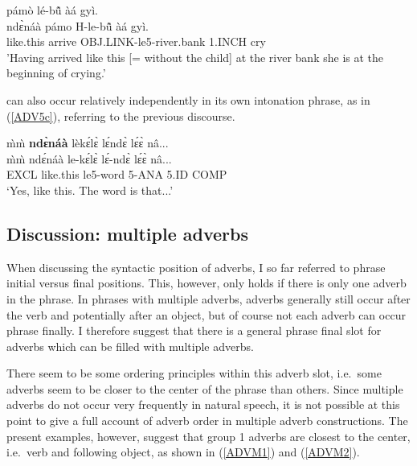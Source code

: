 \begin{exe} 
\ex\label{ADV5b}
   pámò lé-bũ̂ àá gyì. \\
        ndɛ̀náà pámo H-le-bũ̂ àá gyì. \\
        like.this arrive OBJ.LINK-le5-river.bank 1.INCH cry  \\
    \trans 'Having arrived like this [= without the child] at the river bank she is at the beginning of crying.'
\end{exe}

 can also occur relatively independently in its own intonation phrase, as in (\ref{ADV5c}), referring to the previous discourse.

\begin{exe} 
\ex\label{ADV5c}
  \glll   m̀m̀ {\bfseries ndɛ̀náà} lèkɛ́lɛ̀ lɛ́ndɛ̀ lɛ́ɛ̀ nâ... \\
        m̀m̀ ndɛ́náà le-kɛ́lɛ̀ lɛ́-ndɛ̀ lɛ́ɛ̀ nâ... \\
         EXCL like.this  le5-word 5-ANA 5.ID COMP \\
    \trans `Yes, like this. The word is that...'
\end{exe}

\fi


\subsection{Discussion: multiple adverbs} 
\label{sec:MultiADV}

When discussing the syntactic position of adverbs, I so far referred to phrase initial versus final positions. This, however, only holds if there is only one adverb in the phrase. In phrases with multiple adverbs, adverbs generally still occur after the verb and potentially after an object, but of course not each adverb can occur phrase finally. I therefore suggest that there is a general phrase final slot for adverbs which can be filled with multiple adverbs.

There seem to be some ordering principles within this adverb slot, i.e.\ some adverbs seem to be closer to the center of the phrase than others. Since multiple adverbs do not occur very frequently in natural speech, it is not possible at this point to give a full account of adverb order in multiple adverb constructions. The present examples, however, suggest that group 1 adverbs are closest to the center, i.e.\ verb and following object, as shown in (\ref{ADVM1}) and (\ref{ADVM2}).


